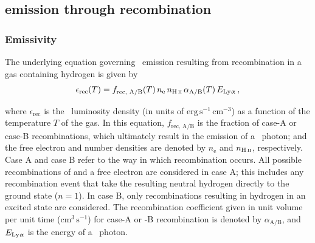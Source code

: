 \subsection{\texorpdfstring{\lya}{\lyatext} emission through recombination}
\label{chPssec:Lya recombination emission}

\subsubsection{Emissivity}
\label{chPsssec:Recombination emissivity}

The underlying equation governing \lya\ emission resulting from recombination in a gas containing hydrogen is given by \citep[see e.g.][]{2014PASA...31...40D, 2016MNRAS.462.1961S}
\begin{equation}
    \label{chPeq:Recombination emissivity}
    \epsilon_\text{rec}(T) = f_\text{rec, A/B} (T) \, n_\text{e} \, n_\text{\ion{H}{II}} \, \alpha_\text{A/B}(T) \, E_\text{\lya} \, ,
\end{equation}

\noindent where $\epsilon_\text{rec}$ is the \lya\ luminosity density (in units of $\mathrm{erg \, s^{-1} \, cm^{-3}}$) as a function of the temperature $T$ of the gas. In this equation, $f_\text{rec, A/B}$ is the fraction of case-A or case-B recombinations, which ultimately result in the emission of a \lya\ photon; and the free electron and  number densities are denoted by $n_\text{e}$ and $n_\text{\ion{H}{II}}$, respectively. Case A and case B refer to the way in which recombination occurs. All possible recombinations of  and a free electron are considered in case A; this includes any recombination event that take the resulting neutral hydrogen directly to the ground state ($n=1$). In case B, only recombinations resulting in hydrogen in an excited state are considered. The recombination coefficient given in unit volume per unit time ($\mathrm{cm^{3} \, s^{-1}}$) for case-A or -B recombination is denoted by $\alpha_\text{A/B}$, and $E_\text{{Ly\ensuremath{\upalpha}}}$ is the energy of a \lya\ photon.

